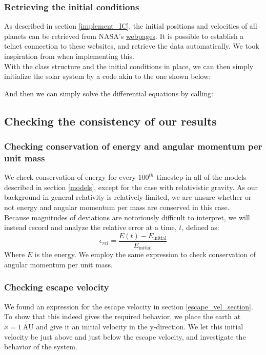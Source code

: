 \documentclass[a4paper, 10pt]{article}
\begin{document}
\subsubsection{Retrieving the initial conditions}
As described in section \ref{implement_IC}, the initial positions and velocities of all planets can be retrieved from NASA's  \href{http://ssd.jpl.nasa.gov/horizons.cgi#top}{webpages}. It is possible to establish a telnet connection to these websites, and retrieve the data automatically. We took inspiration from \cite{NASA} when implementing this.\\
\linebreak
\linebreak
With the class structure and the initial conditions in place, we can then simply initialize the solar system by a code akin to the one shown below:

And then we can simply solve the differential equations by calling:


\subsection{Checking the consistency of our results}
\subsubsection{Checking conservation of energy and angular momentum per unit mass}
We check conservation of energy for every 10$0^{th}$ timestep in all of the models described in section \ref{models}, except for the case with relativistic gravity. As our background in general relativity is relatively limited, we are unsure whether or not energy and angular momentum per mass are conserved in this case.\\
\linebreak
Because magnitudes of deviations are notoriously difficult to interpret, we will instead record and analyze the relative error at a time, $t$, defined as:
\begin{equation}\label{eq:relative_error}
\epsilon_{rel}=\frac{E(t)-E_{\mathrm{initial}}}{E_{\mathrm{initial}}}
\end{equation}
Where $E$ is the energy. We employ the same expression to check conservation of angular momentum per unit mass.
\subsubsection{Checking escape velocity}
We found an expression for the escape velocity in section \ref{escape_vel_section}. To show that this indeed gives the required behavior, we place the earth at $x=1\ \mathrm{AU}$ and give it an initial velocity in the y-direction. We let this initial velocity be just above and just below the escape velocity, and investigate the behavior of the system.
\end{document}
